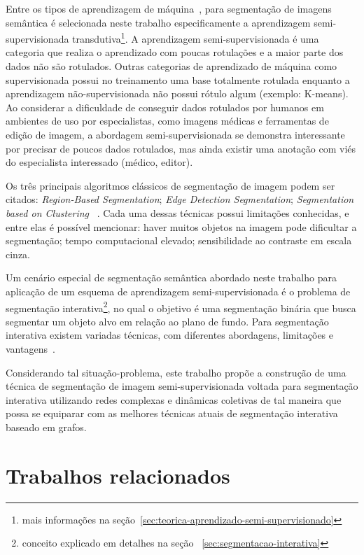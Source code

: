 Entre os tipos de aprendizagem de máquina~\cite{sah2020machine}, para segmentação de imagens
semântica é selecionada neste trabalho especificamente a aprendizagem
semi-supervisionada transdutiva\footnote{mais informações na
seção~\ref{sec:teorica-aprendizado-semi-supervisionado}}. A
aprendizagem semi-supervisionada é uma categoria que realiza o
aprendizado com poucas rotulações e a maior parte dos dados não são
rotulados. Outras categorias de aprendizado de máquina como
supervisionada possui no treinamento uma base totalmente rotulada
enquanto a aprendizagem não-supervisionada não possui rótulo algum
(exemplo: K-means). Ao considerar a dificuldade de conseguir dados
rotulados por humanos em ambientes de uso por especialistas, como imagens
médicas e ferramentas de edição de imagem, a abordagem
semi-supervisionada se demonstra interessante por precisar de poucos
dados rotulados, mas ainda existir uma anotação com viés do
especialista interessado (médico, editor).


Os três principais algoritmos clássicos de segmentação de imagem podem
ser citados: \textit{Region-Based Segmentation}; \textit{Edge Detection
  Segmentation}; \textit{Segmentation based on Clustering}
~\cite{ImageSegmentationTechniques1985}. Cada uma dessas técnicas
possui limitações conhecidas, e entre elas é possível mencionar: haver
muitos objetos na imagem pode dificultar a segmentação; tempo
computacional elevado; sensibilidade ao contraste em escala cinza.

Um cenário especial de segmentação semântica abordado neste trabalho
para aplicação de um esquema de aprendizagem semi-supervisionada é o
problema de segmentação interativa\footnote{conceito explicado em
detalhes na seção ~\ref{sec:segmentacao-interativa}}, no qual o
objetivo é uma segmentação binária que busca segmentar um objeto alvo
em relação ao plano de fundo. Para segmentação interativa existem
variadas técnicas, com diferentes abordagens, limitações e
vantagens~\cite{ramadan2020survey}.

Considerando tal situação-problema, este trabalho propõe a construção
de uma técnica de segmentação de imagem semi-supervisionada voltada
para segmentação interativa utilizando redes complexas e dinâmicas
coletivas de tal maneira que possa se equiparar com as melhores técnicas
atuais de segmentação interativa baseado em grafos.

\section{Trabalhos relacionados}\label{cap:trabalhos-relacionados}

